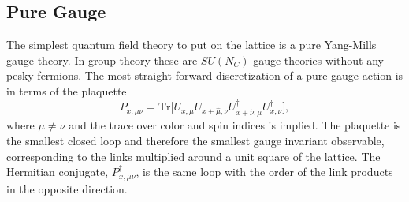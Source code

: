 
\subsection{Pure Gauge}
The simplest quantum field theory to put on the lattice is a pure Yang-Mills gauge theory.
In group theory these are $SU(N_C)$ gauge theories without any pesky fermions.
The most straight forward discretization of a pure gauge action is in terms of the plaquette
\begin{equation}
  P_{x,\mu\nu}=\mbox{Tr}\Big[U_{x,\mu}U_{x+\hat{\mu},\nu}U^{\dagger}_{x+\hat{\nu},\mu}U^{\dagger}_{x,\nu}\Big],
\end{equation}
where $\mu\neq\nu$ and the trace over color and spin indices is implied.
The plaquette is the smallest closed loop and therefore the smallest gauge invariant observable, corresponding to the links multiplied around a unit square of the lattice.
The Hermitian conjugate, $P^{\dagger}_{x,\mu\nu}$, is the same loop with the order of the link products in the opposite direction.

